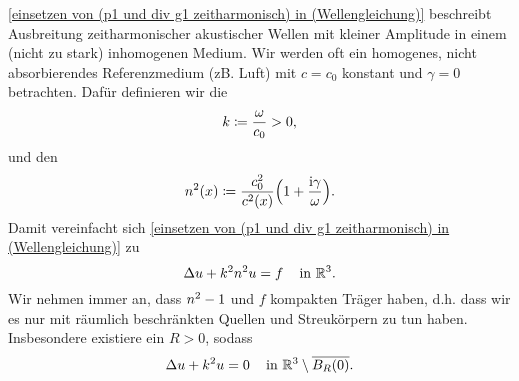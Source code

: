 \eqref{einsetzen von (p1 und div g1 zeitharmonisch) in (Wellengleichung)} beschreibt Ausbreitung zeitharmonischer akustischer Wellen mit kleiner Amplitude in einem (nicht zu stark) inhomogenen Medium. Wir werden oft ein homogenes, nicht absorbierendes Referenzmedium (zB. Luft) mit \(c=c_0\) konstant und \(\gamma=0\) betrachten. Dafür definieren wir die 
\begin{equation*}
	k\coloneqq\frac{\omega}{c_0}>0,
\end{equation*}
und den 
\begin{equation*}
	n^2(x)\coloneqq\frac{c_0^2}{c^2(x)}\Big(1+\frac{\mathrm{i}\gamma}{\omega}\Big).
\end{equation*}
Damit vereinfacht sich \eqref{einsetzen von (p1 und div g1 zeitharmonisch) in (Wellengleichung)} zu
\begin{equation}
	\label{erste helmholtzgleichung}
	\Delta u+k^2n^2u=f\;\;\;\text{ in }\mathbb{R}^3.
\end{equation}
Wir nehmen immer an, dass \(n^2- 1\) und \(f\) kompakten Träger haben, d.h. dass wir es nur mit räumlich beschränkten Quellen und Streukörpern zu tun haben. Insbesondere existiere ein \(R>0\), sodass
\begin{equation*}
	\Delta u+k^2u=0\;\;\;\text{ in }\mathbb{R}^3\setminus\overline{B_R(0)}.
\end{equation*}

